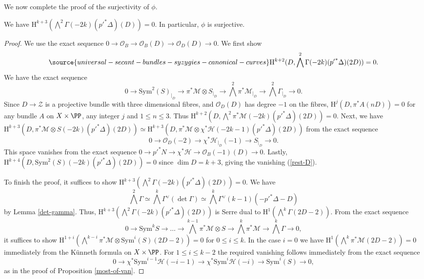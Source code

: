 We now complete the proof of the surjectivity of $\phi$.
\begin{prop}
\notready
We have $\mathrm{H}^{k+3}(\bigwedge^2\Gamma (-2k)({p'}^*\Delta)(D))=0$. In particular, $\phi$ is surjective.
\end{prop}
\begin{proof}
We use the exact sequence $0 \to \mathcal{O}_B \to \mathcal{O}_B(D) \to \mathcal{O}_D(D) \to 0.$ We first show \begin{equation} \label{rest-D}
\source{universal-secant-bundles-syzygies-canonical-curves}
\mathrm{H}^{k+2}(D,\bigwedge^2\Gamma (-2k)({p'}^*\Delta)(2D))=0.
\end{equation}
We have the exact sequence
$$0 \to \mathrm{Sym}^2(S)_{|_D} \to \pi^*\mathcal{M} \otimes S_{|_D} \to \bigwedge^2 \pi^*\mathcal{M}_{|_D} \to \bigwedge^2 \Gamma_{|_D} \to 0.$$
Since $D \to \mathcal{Z}$ is a projective bundle with three dimensional fibres, and $\mathcal{O}_D(D)$ has degree $-1$ on the fibres, $\mathrm{H}^j(D,\pi^*A(nD))=0$
for any bundle $A$ on $X \times \PP$, any integer $j$ and $1 \leq n \leq 3$. Thus $\mathrm{H}^{k+2}(D,\bigwedge^2\pi^*\mathcal{M}(-2k)({p'}^*\Delta)(2D))=0.$ Next, we have $\mathrm{H}^{k+3}(D,\pi^*\mathcal{M} \otimes S(-2k)({p'}^*\Delta)(2D))\simeq \mathrm{H}^{k+3}(D,\pi^*\mathcal{M} \otimes \chi^*\mathcal{H}(-2k-1)({p'}^*\Delta)(2D))$ from the exact sequence $$0 \to \mathcal{O}_D(-2) \to \chi^*\mathcal{H}_{|_D}(-1) \to S_{|_D} \to 0.$$ This space vanishes from the exact sequence $0 \to {p'}^*N \to \chi^*\mathcal{H} \to \mathcal{O}_B(-1)(D) \to 0.$ Lastly, $\mathrm{H}^{k+4}(D, \mathrm{Sym}^2(S)(-2k)({p'}^*\Delta)(2D))=0$ since $\dim D=k+3$, giving the vanishing (\ref{rest-D}).

To finish the proof, it suffices to show $\mathrm{H}^{k+3}(\bigwedge^2\Gamma (-2k)({p'}^*\Delta)(2D))=0$. We have $$\bigwedge^2 \Gamma \simeq \bigwedge^k \Gamma^{\vee}(\det \Gamma)\simeq \bigwedge^k \Gamma^{\vee}(k-1)(-{p'}^*\Delta-D)$$ by Lemma \ref{det-gamma}. Thus, $\mathrm{H}^{k+3}(\bigwedge^2\Gamma (-2k)({p'}^*\Delta)(2D))$ is Serre dual to $\mathrm{H}^{1}(\bigwedge^k\Gamma (2D-2))$. From the exact sequence
{\small{$$0 \to \mathrm{Sym}^k S \to \ldots \to \bigwedge^{k-1}\pi^*\mathcal{M} \otimes S \to \bigwedge^k \pi^* \mathcal{M} \to \bigwedge^k \Gamma \to 0,$$}}
it suffices to show $\mathrm{H}^{1+i}(\bigwedge^{k-i}\pi^*\mathcal{M} \otimes \mathrm{Sym}^i(S)(2D-2))=0$ for $0 \leq i \leq k$. In the case $i=0$ we have $\mathrm{H}^{1}(\bigwedge^{k}\pi^*\mathcal{M}(2D-2))=0$ immediately from the K\"unneth formula on $X \times \PP$. For $1 \leq i \leq k-2$ the required vanishing follows immediately from the exact sequence
$$0 \to \chi^* \mathrm{Sym}^{i-1} \mathcal{H} (-i-1) \to \chi^*\mathrm{Sym}^{i} \mathcal{H} (-i) \to \mathrm{Sym}^i(S) \to 0,$$
as in the proof of Proposition \ref{most-of-van}.


\end{proof}
